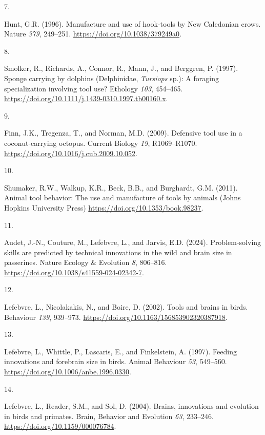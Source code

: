 \documentclass[
  man, donotrepeattitle,floatsintext]{apa6}
\newlength{\cslhangindent}
\newlength{\csllabelwidth}
\newlength{\cslentryspacingunit} %
\newenvironment{CSLReferences}[2] %
 {%
  \setlength{\parindent}{0pt}
  \ifodd #1
  \let\oldpar\par
  \def\par{\hangindent=\cslhangindent\oldpar}
  \fi
  \setlength{\parskip}{#2\cslentryspacingunit}
 }%
 {}
\newcommand{\CSLLeftMargin}[1]{\parbox[t]{\csllabelwidth}{#1}}
\newcommand{\CSLRightInline}[1]{\parbox[t]{\linewidth - \csllabelwidth}{#1}\break}
\begin{document}
\begin{CSLReferences}{0}{0}
\leavevmode{}%
\CSLLeftMargin{7. }%
\CSLRightInline{Hunt, G.R. (1996). Manufacture and use of hook-tools by {N}ew {C}aledonian crows. Nature \emph{379}, 249--251. \url{https://doi.org/10.1038/379249a0}.}

\leavevmode{}%
\CSLLeftMargin{8. }%
\CSLRightInline{Smolker, R., Richards, A., Connor, R., Mann, J., and Berggren, P. (1997). Sponge carrying by dolphins ({D}elphinidae, \emph{{T}ursiops} sp.): A foraging specialization involving tool use? Ethology \emph{103}, 454--465. \url{https://doi.org/10.1111/j.1439-0310.1997.tb00160.x}.}

\leavevmode{}%
\CSLLeftMargin{9. }%
\CSLRightInline{Finn, J.K., Tregenza, T., and Norman, M.D. (2009). Defensive tool use in a coconut-carrying octopus. Current Biology \emph{19}, R1069--R1070. \url{https://doi.org/10.1016/j.cub.2009.10.052}.}

\leavevmode{}%
\CSLLeftMargin{10. }%
\CSLRightInline{Shumaker, R.W., Walkup, K.R., Beck, B.B., and Burghardt, G.M. (2011). Animal tool behavior: The use and manufacture of tools by animals (Johns Hopkins University Press) \url{https://doi.org/10.1353/book.98237}.}

\leavevmode{}%
\CSLLeftMargin{11. }%
\CSLRightInline{Audet, J.-N., Couture, M., Lefebvre, L., and Jarvis, E.D. (2024). Problem-solving skills are predicted by technical innovations in the wild and brain size in passerines. Nature Ecology \& Evolution \emph{8}, 806--816. \url{https://doi.org/10.1038/s41559-024-02342-7}.}

\leavevmode{}%
\CSLLeftMargin{12. }%
\CSLRightInline{Lefebvre, L., Nicolakakis, N., and Boire, D. (2002). Tools and brains in birds. Behaviour \emph{139}, 939--973. \url{https://doi.org/10.1163/156853902320387918}.}

\leavevmode{}%
\CSLLeftMargin{13. }%
\CSLRightInline{Lefebvre, L., Whittle, P., Lascaris, E., and Finkelstein, A. (1997). Feeding innovations and forebrain size in birds. Animal Behaviour \emph{53}, 549--560. \url{https://doi.org/10.1006/anbe.1996.0330}.}

\leavevmode{}%
\CSLLeftMargin{14. }%
\CSLRightInline{Lefebvre, L., Reader, S.M., and Sol, D. (2004). Brains, innovations and evolution in birds and primates. Brain, Behavior and Evolution \emph{63}, 233--246. \url{https://doi.org/10.1159/000076784}.}


\end{CSLReferences}
\end{document}
